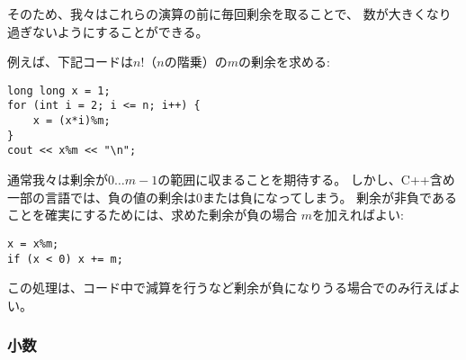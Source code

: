 \begin{comment}
Thus, we can take the remainder after every operation
and the numbers will never become too large.

For example, the following code calculates $n!$,
the factorial of $n$, modulo $m$:
\end{comment}

そのため、我々はこれらの演算の前に毎回剰余を取ることで、
数が大きくなり過ぎないようにすることができる。

例えば、下記コードは$n!$（$n$の階乗）の$m$の剰余を求める:

\begin{lstlisting}
long long x = 1;
for (int i = 2; i <= n; i++) {
    x = (x*i)%m;
}
cout << x%m << "\n";
\end{lstlisting}

\begin{comment}
Usually we want the remainder to always
be between $0\ldots m-1$.
However, in C++ and other languages,
the remainder of a negative number
is either zero or negative.
An easy way to make sure there
are no negative remainders is to first calculate
the remainder as usual and then add $m$
if the result is negative:
\begin{lstlisting}
x = x%m;
if (x < 0) x += m;
\end{lstlisting}
However, this is only needed when there
are subtractions in the code and the
remainder may become negative.
\end{comment}

通常我々は剰余が$0\ldots m-1$の範囲に収まることを期待する。
しかし、C++含め一部の言語では、負の値の剰余は0または負になってしまう。
剰余が非負であることを確実にするためには、求めた剰余が負の場合
$m$を加えればよい:
\begin{lstlisting}
x = x%m;
if (x < 0) x += m;
\end{lstlisting}
この処理は、コード中で減算を行うなど剰余が負になりうる場合でのみ行えばよい。

\begin{comment}
\subsubsection{Floating point numbers}

\index{floating point number}
\end{comment}

\subsubsection{小数}

